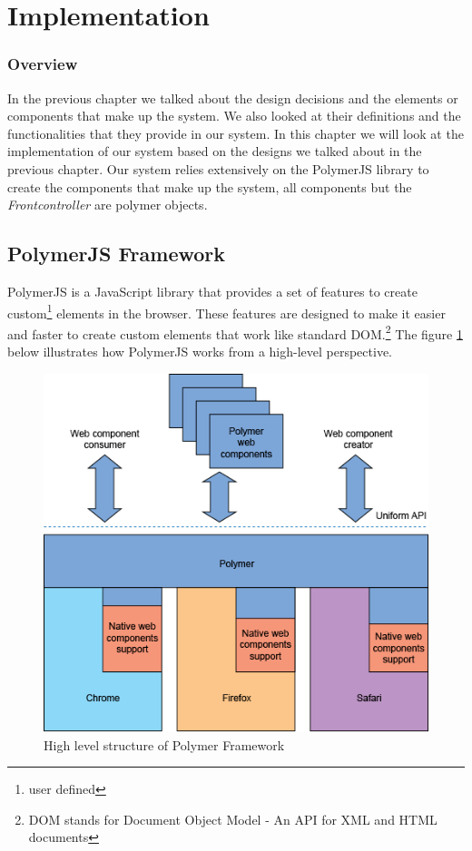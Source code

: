 \section{Implementation}
\subsubsection{Overview}
In the previous chapter we talked about the design decisions and the elements or components that make up the system. We also looked at their definitions and the functionalities that they provide in our system. In this chapter we will look at the implementation of our system based on the designs we talked about in the previous chapter. Our system relies extensively on the PolymerJS library to create the components that make up the system, all components but the \emph{Frontcontroller} are polymer objects.
\subsection{PolymerJS Framework}
PolymerJS \cite{website:PolymerJS} is a JavaScript library that provides a set of features to create custom\footnote{user defined} elements in the browser. These features are designed to make it easier and faster to create custom elements that work like standard DOM.\footnote{DOM stands for Document Object Model - An API for XML and HTML documents} The figure \ref{fig:PolymerArch} below illustrates how PolymerJS works from a high-level perspective. 

\begin{figure}[!ht]
\caption{High level structure of Polymer Framework}
    \label{fig:PolymerArch}
    \centering
    \includegraphics[scale=0.5]{figures/PolymerJSArch}
\end{figure}

